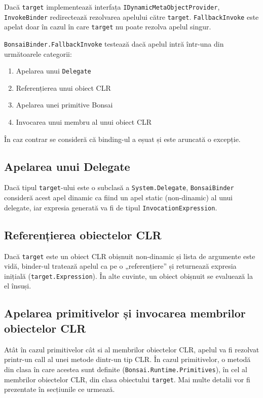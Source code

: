 \documentclass[12pt,a4paper]{memoir}
\renewcommand{\c}{\texttt}
\begin{document}
Dacă \c{target} implementează interfața \c{IDynamicMetaObjectProvider}, \\\c{InvokeBinder} redirectează rezolvarea apelului către \c{target}. \c{FallbackInvoke} este apelat doar în cazul în care \c{target} nu poate rezolva apelul singur.

\c{BonsaiBinder.FallbackInvoke} testează dacă apelul intră într-una din următoarele categorii:
\begin{enumerate}
\item Apelarea unui \c{Delegate}
\item Referențierea unui obiect CLR
\item Apelarea unei primitive Bonsai
\item Invocarea unui membru al unui obiect CLR
\end{enumerate}

În caz contrar se consideră că binding-ul a eșuat și este aruncată o excepție.

\subsection{Apelarea unui Delegate}

Dacă tipul \c{target}-ului este o subclasă a \c{System.Delegate}, \c{BonsaiBinder} consideră acest apel dinamic ca fiind un apel static (non-dinamic) al unui delegate, iar expresia generată va fi de tipul \c{InvocationExpression}.

\subsection{Referențierea obiectelor CLR}

Dacă \c{target} este un obiect CLR obișnuit non-dinamic și lista de argumente este vidă, binder-ul tratează apelul ca pe o „referențiere” și returnează expresia inițială (\c{target.Expression}). În alte cuvinte, un obiect obișnuit se evaluează la el însuși.

\subsection{Apelarea primitivelor și invocarea membrilor obiectelor CLR}

Atât în cazul primitivelor cât si al membrilor obiectelor CLR, apelul va fi rezolvat printr-un call al unei metode dintr-un tip CLR. În cazul primitivelor, o metodă din clasa în care acestea sunt definite (\c{Bonsai.Runtime.Primitives}), în cel al membrilor obiectelor CLR, din clasa obiectului \c{target}. Mai multe detalii vor fi prezentate în secțiunile ce urmează.
\end{document}
